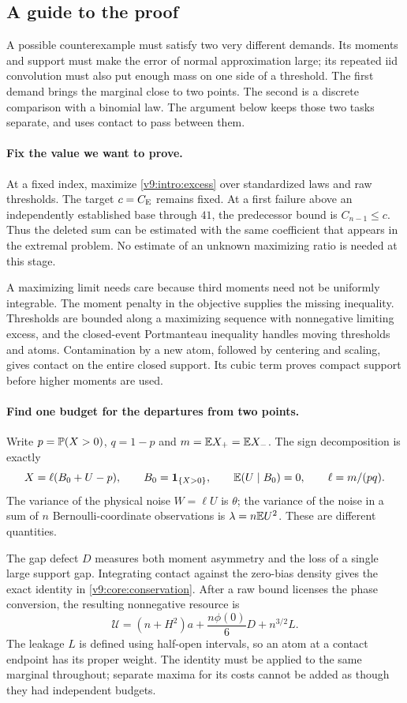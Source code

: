 \subsection{A guide to the proof}\label{ms:guide}

A possible counterexample must satisfy two very different demands. Its
moments and support must make the error of normal approximation large;
its repeated iid convolution must also put enough mass on one side of a
threshold. The first demand brings the marginal close to two points. The
second is a discrete comparison with a binomial law. The argument below
keeps those two tasks separate, and uses contact to pass between them.

\paragraph{Fix the value we want to prove.}
At a fixed index, maximize \eqref{v9:intro:excess} over standardized laws
and raw thresholds. The target $c=C_{\mathrm E}$ remains fixed. At a first failure
above an independently established base through $41$, the predecessor
bound is $C_{n-1}\le c$. Thus the deleted sum can be estimated with the
same coefficient that appears in the extremal problem. No estimate of an
unknown maximizing ratio is needed at this stage.

A maximizing limit needs care because third moments need not be uniformly
integrable. The moment penalty in the objective supplies the missing
inequality. Thresholds are bounded along a maximizing sequence with
nonnegative limiting excess, and the closed-event Portmanteau inequality
handles moving thresholds and atoms. Contamination by a new atom, followed
by centering and scaling, gives contact on the entire closed support.
Its cubic term proves compact support before higher moments are used.

\paragraph{Find one budget for the departures from two points.}
Write $p=\mathbb P(X>0)$, $q=1-p$ and $m=\mathbb E X_+=\mathbb E X_-$.
The sign decomposition is exactly
\[
 X=\ell(B_0+U-p),\qquad B_0=\mathbf1_{\{X>0\}},\qquad
 \mathbb E(U\mid B_0)=0,\qquad \ell=m/(pq).
\]
The variance of the physical noise $W=\ell U$ is $\theta$; the variance
of the noise in a sum of $n$ Bernoulli-coordinate observations is
$\lambda=n\mathbb E U^2$. These are different quantities.

The gap defect $D$ measures both moment asymmetry and the loss of a
single large support gap. Integrating contact against the zero-bias
density gives the exact identity in \eqref{v9:core:conservation}.
After a raw bound licenses the phase conversion, the resulting
nonnegative resource is
\[
 \mathcal U=(n+H^2)a+\frac{n\phi(0)}6D+n^{3/2}L.
\]
The leakage $L$ is defined using half-open intervals, so an atom at a
contact endpoint has its proper weight. The identity must be applied to
the same marginal throughout; separate maxima for its costs cannot be
added as though they had independent budgets.

